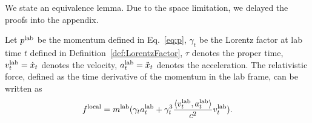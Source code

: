 We state an equivalence lemma. Due to the space limitation, we delayed the proofs into the appendix.
\begin{lemma}\label{lem:equiv_relativistic_force:informal}
Let $p^{\rm lab}$ be the momentum defined in Eq.~\eqref{eq:p}, $\gamma_t$ be the Lorentz factor at lab time $t$ defined in Definition~\ref{def:LorentzFactor}, $\tau$ denotes the proper time, $v_t^{\rm lab} = \dot{x}_t$ denotes the velocity, 
$a_t^{\rm lab} = \ddot{x}_t$ denotes the acceleration.
The relativistic force, defined as the time derivative of the momentum in the lab frame, can be written as
\begin{align*}
f^{\rm local} =  m^{\rm lab}  (\gamma_t a_t^{\rm lab} + \gamma_t^3 \frac{ \langle v_t^{\rm lab}, a_t^{\rm lab} \rangle}{c^2} v_t^{\rm lab}).
\end{align*}

\end{lemma} 